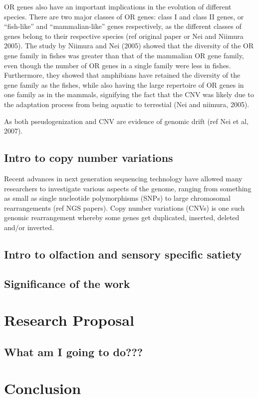 \documentclass[a4paper, 12pt]{article}
\begin{document}
OR genes also have an important implications in the evolution of different species.
There are two major classes of OR genes: class I and class II genes, or ``fish-like'' and ``mammalian-like'' genes respectively, as the different classes of genes belong to their respective species (ref original paper or Nei and Niimura 2005).
The study by Niimura and Nei (2005) showed that the diversity of the OR gene family in fishes was greater than that of the mammalian OR gene family, even though the number of OR genes in a single family were less in fishes.
Furthermore, they showed that amphibians have retained the diversity of the gene family as the fishes, while also having the large repertoire of OR genes in one family as in the mammals, signifying the fact that the CNV was likely due to the adaptation process from being aquatic to terrestial (Nei and niimura, 2005).

As both pseudogenization and CNV are evidence of genomic drift (ref Nei et al, 2007).

\subsection*{Intro to copy number variations}

Recent advances in next generation sequencing technology have allowed many researchers to investigate various aspects of the genome, ranging from something as small as single nucleotide polymorphisms (SNPs) to large chromosomal rearrangements (ref NGS papers).
Copy number variations (CNVs) is one such genomic rearrangement whereby some genes get duplicated, inserted, deleted and/or inverted.

\subsection*{Intro to olfaction and sensory specific satiety}



\subsection*{Significance of the work}

\section*{Research Proposal}

\subsection*{What am I going to do???}

\section*{Conclusion}
\end{document}
